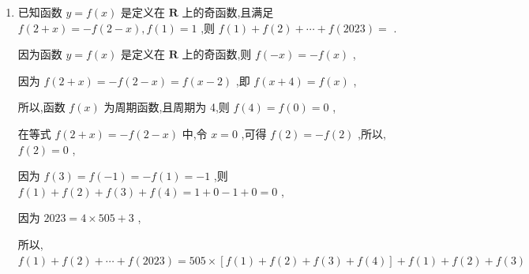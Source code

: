 \begin{enumerate}
\begin{jieda}
        所以, $f\left( {1 + x}\right)  + f\left( {1 - x}\right)  = 4$ ,
        
        在等式 $f\left( {1 + x}\right)  + f\left( {1 - x}\right)  = 4$ 中,令 $x = 0$ ,可得 ${2f}\left( 1\right)  = 4$ ,解得 $f\left( 1\right)  = 2$ ,
        
        又因为 $f\left( {1 - x}\right)  = f\left( {3 + x}\right)$ ,则 $f\left( {1 + x}\right)  + f\left( {3 + x}\right)  = 4$ 
        
        所以, $f\left( {x + 3}\right)  + f\left( {x + 5}\right)  = 4$
        
        因此 $f\left( {x + 5}\right)  = f\left( {x + 1}\right)$ ,即 $f\left( {x + 4}\right)  = f\left( x\right)$ ,
        
        所以,函数 $f\left( x\right)$ 为周期函数,且该函数的周期为 4 ,
        
        所以, $f\left( {2023}\right)  = f\left( {4 \times  {505} + 3}\right)  = f\left( 3\right)  = 4 - f\left( 1\right)  = 2$ .
    \end{jieda}
    \item 已知函数 $y = f\left( x\right)$ 是定义在 $\mathbf{R}$ 上的奇函数,且满足 $f\left( {2 + x}\right)  =  - f\left( {2 - x}\right) ,f\left( 1\right)  = 1$ ,则 $f\left( 1\right)  + f\left( 2\right)  + \cdots  + f\left( {2023}\right)  =$ .
    \begin{jieda}
        因为函数 $y = f\left( x\right)$ 是定义在 $\mathbf{R}$ 上的奇函数,则 $f\left( {-x}\right)  =  - f\left( x\right)$ ,
        
        因为 $f\left( {2 + x}\right)  =  - f\left( {2 - x}\right)  = f\left( {x - 2}\right)$ ,即 $f\left( {x + 4}\right)  = f\left( x\right)$ ,
        
        所以,函数 $f\left( x\right)$ 为周期函数,且周期为 4,则 $f\left( 4\right)  = f\left( 0\right)  = 0$ ,
        
        在等式 $f\left( {2 + x}\right)  =  - f\left( {2 - x}\right)$ 中,令 $x = 0$ ,可得 $f\left( 2\right)  =  - f\left( 2\right)$ ,所以, $f\left( 2\right)  = 0$ ,
        
        因为 $f\left( 3\right)  = f\left( {-1}\right)  =  - f\left( 1\right)  =  - 1$ ,则 $f\left( 1\right)  + f\left( 2\right)  + f\left( 3\right)  + f\left( 4\right)  = 1 + 0 - 1 + 0 = 0$ ,
        
        因为 ${2023} = 4 \times  {505} + 3$ ,
        
        所以, $f\left( 1\right)  + f\left( 2\right)  + \cdots  + f\left( {2023}\right)  = {505} \times  \left\lbrack  {f\left( 1\right)  + f\left( 2\right)  + f\left( 3\right)  + f\left( 4\right) }\right\rbrack   + f\left( 1\right)  + f\left( 2\right)  + f\left( 3\right)$
        

\end{jieda}
\end{enumerate}
